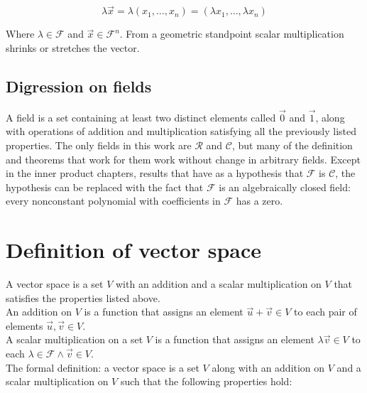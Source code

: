   $$\lambda\vec{x} = \lambda(x_1,\dots, x_n) = (\lambda x_1, \dots, \lambda x_n)$$

  Where $\lambda\in\mathcal{F}$ and $\vec{x}\in\mathcal{F}^n$.
  From a geometric standpoint scalar multiplication shrinks or stretches the vector.

  \subsection{Digression on fields}
  A field is a set containing at least two distinct elements called $\vec{0}$ and $\vec{1}$, along with operations of addition and multiplication satisfying all the previously listed properties.
  The only fields in this work are $\mathcal{R}$ and $\mathcal{C}$, but many of the definition and theorems that work for them work without change in arbitrary fields.
  Except in the inner product chapters, results that have as a hypothesis that $\mathcal{F}$ is $\mathcal{C}$, the hypothesis can be replaced with the fact that $\mathcal{F}$ is an algebraically closed field: every nonconstant polynomial with coefficients in $\mathcal{F}$ has a zero.

\section{Definition of vector space}
A vector space is a set $V$ with an addition and a scalar multiplication on $V$ that satisfies the properties listed above.\\
An addition on $V$ is a function that assigns an element $\vec{u}+\vec{v}\in V$ to each pair of elements $\vec{u}, \vec{v}\in V$.\\
A scalar multiplication on a set $V$ is a function that assigns an element $\lambda\vec{v}\in V$ to each $\lambda\in\mathcal{F}\land\vec{v}\in V$.\\
The formal definition: a vector space is a set $V$ along with an addition on $V$ and a scalar multiplication on $V$ such that the following properties hold:

